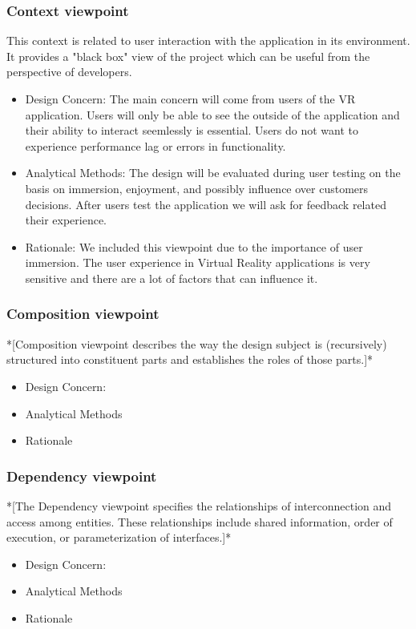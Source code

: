 \documentclass[10pt,journal,compsoc,onecolumn, draftclsnofoot]{IEEEtran}
\begin{document}
\subsubsection{Context viewpoint}
This context is related to user interaction with the application in its
environment. It provides a "black box" view of the project which can be useful
from the perspective of developers.
\begin{itemize}
  \item Design Concern: The main concern will come from users of the VR
  application. Users will only be able to see the outside of the application
  and their ability to interact seemlessly is essential. Users do not want to
  experience performance lag or errors in functionality.
  \item Analytical Methods: The design will be evaluated during user testing on
  the basis on immersion, enjoyment, and possibly influence over customers
  decisions. After users test the application we will ask for feedback related
  their experience.
  \item Rationale: We included this viewpoint due to the importance of user
  immersion. The user experience in Virtual Reality applications is very
  sensitive and there are a lot of factors that can influence it.
\end{itemize}
\subsubsection{Composition viewpoint}
*[Composition viewpoint describes the way the design subject is (recursively) structured into constituent parts and establishes the roles of those parts.]*
\begin{itemize}
  \item Design Concern:
  \item Analytical Methods
  \item Rationale
\end{itemize}
\subsubsection{Dependency viewpoint}
*[The Dependency viewpoint specifies the relationships of interconnection and access among entities. These relationships include shared information, order of execution, or parameterization of interfaces.]*
\begin{itemize}
  \item Design Concern:
  \item Analytical Methods
  \item Rationale
\end{itemize}
\end{document}

